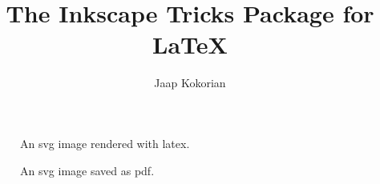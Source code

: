 \documentclass{article}
\title{The Inkscape Tricks Package for \LaTeX}
\author{Jaap Kokorian}
\begin{document}
\maketitle

\begin{figure}[htbp]

\caption{An svg image rendered with latex.}
\end{figure}
%
\begin{figure}[htbp]

\caption{An svg image saved as pdf.}
\end{figure}
%
\end{document}
